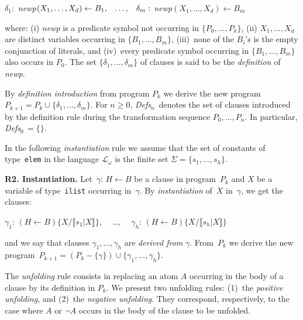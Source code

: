 \documentclass[english]{tlp}
\newcommand{\Mathit}[1]{\mbox{\it #1}}
\newcommand{\Defsn}{\Mathit{Defs}$_{n}$}
\newcommand{\Defsz}{\Mathit{Defs}\/$_{0}$}
\begin{document}
\( \delta _{1}: \) {\it{newp}}$(X_{1},\ldots ,X_{d})\leftarrow
B_{1}, \) \( \ \ \ldots , \) \ \ \( \delta _{m}: \) \(
${\it{newp}}$(X_{1},\ldots ,X_{d})\leftarrow B_{m}$

\smallskip{}

\noindent where: (i) {\it{newp}} is a predicate symbol not occurring
in \( \{P_{0},\ldots ,P_{k}\} \), (ii) \( X_{1},\ldots ,X_{d} \) are
distinct variables occurring in \( \{ B_{1},\ldots ,B_{m}\} \),
(iii)~none of the $B_i$'s is the empty conjunction of literals,
and (iv)~every predicate symbol occurring in \( \{B_{1},\ldots ,B_{m}\}
\) also occurs in \( P_{0} \). The set $\{\delta _{1}, \ldots,
\delta _{m}\}$ of clauses is said to be the {\em definition} of
{\it{newp}}.

\noindent By \emph{definition introduction} from program \(
P_{k} \) we derive the new program \( P_{k+1}\!=\!P_{k}\cup \{\delta
_{1},\ldots ,\delta _{m}\} \). For \( n\!\geq \!0 \),
\Defsn~denotes the set of clauses introduced by the definition rule
during the transformation sequence \( P_{0},\ldots ,P_{n} \). In
particular, \Defsz$\,=\!\{\}$.

\medskip{}

\noindent In the following {\em instantiation} rule we assume that the set
 of constants of type~\texttt{elem} in the language
$\mathcal{L}_{\omega}$ is the finite set
$\Sigma\!=\!\{s_1,\ldots,s_h\}$.

\smallskip

\noindent \textbf{R2. Instantiation.}\label{rule:inst} Let~$\gamma$:
$H\leftarrow B$ be a clause in program~$P_k$ and $X$ be a variable
of type~\texttt{ilist} occurring in~$\gamma$. By
\emph{instantiation} of~$X$ in~$\gamma$, we get the clauses:

\smallskip

$\gamma_{1}$: $(H\leftarrow B)\{X/\llbracket s_1|X\rrbracket \}$,
~~\ldots,~~ $\gamma_{h}$: $(H\leftarrow B)\{X/\llbracket
s_h|X\rrbracket \}$

\smallskip

\noindent and we say that clauses $\gamma_1,\ldots,\gamma_h$ are
{\it{derived from}} $\gamma$. From~$P_{k}$ we derive the new
program~$P_{k+1}=(P_{k}-\{\gamma\})\cup\{\gamma_{1},\ldots,\gamma_{h}\}$.

\medskip

The \emph{unfolding} rule consists in replacing an atom $A$
occurring in the body of a clause by its definition in $P_k$. We
present two unfolding rules: (1)~the {\em positive unfolding}, and
(2)~the {\em negative unfolding}. They correspond, respectively, to
the case where $A$ or $\neg A$ occurs in the body of the clause to
be unfolded.
\end{document}
